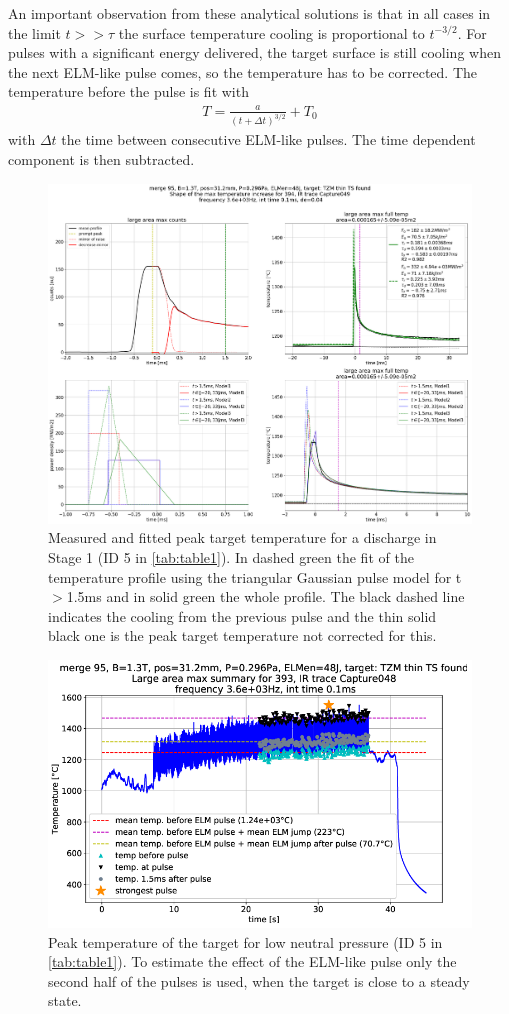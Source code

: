 An important observation from these analytical solutions is that in all cases in the limit $t>>\tau$ the surface temperature cooling is proportional to $t^{-3/2}$. For pulses with a significant energy delivered, the target surface is still cooling when the next ELM-like pulse comes, so the temperature has to be corrected. The temperature before the pulse is fit with
\begin{equation}
\label{eq:squareSS}
\begin{aligned}
T=\frac{a}{ (t+ \Delta t)^{3/2}} + T_{0}
\end{aligned}
\end{equation}
with $\Delta t$ the time between consecutive ELM-like pulses. The time dependent component is then subtracted.


\begin{figure}[!ht]
	\centering
	\includegraphics[width=0.7\linewidth,trim={750 550 10 115},clip]{Chapters/chapter3/figs/file_index_394_IR_trace_Capture049_43_old.png}
	\caption{Measured and fitted peak target temperature for a discharge in Stage 1 (ID 5 in \autoref{tab:table1}). In dashed green the fit of the temperature profile using the triangular Gaussian pulse model for t$>$1.5ms and in solid green the whole profile. The black dashed line indicates the cooling from the previous pulse and the thin solid black one is the peak target temperature not corrected for this.}
	\label{fig:IR4}
\end{figure}

\begin{figure}[!ht]
	\centering
	\includegraphics[width=0.7\linewidth,trim={5 5 55 65},clip]{Chapters/chapter3/figs/file_index_393_IR_trace_Capture048_46.png}
	\caption{Peak temperature of the target for low neutral pressure (ID 5 in \autoref{tab:table1}). To estimate the effect of the ELM-like pulse only the second half of the pulses is used, when the target is close to a steady state.}
	\label{fig:IR5}
\end{figure}

